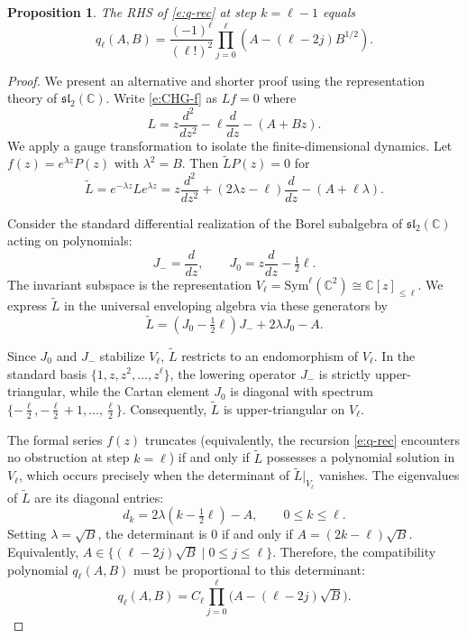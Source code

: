 \documentclass[11pt]{amsart}
\newtheorem{proposition}[theorem]{Proposition}
\theoremstyle{remark}
\numberwithin{equation}{section}
\begin{document}
\begin{proposition} \cite[Lemma 3.3]{Wang_2020} \label{p:topterm}
The RHS of \eqref{e:q-rec} at step $k = \ell - 1$ equals
\begin{equation} \label{e:q-ell}
q_{\ell}(A, B) = \frac{(-1)^\ell}{(\ell !)^2}\prod_{j = 0}^\ell (A - (\ell - 2j)B^{1/2}).
\end{equation}
\end{proposition}

\begin{proof}
We present an alternative and shorter proof using the representation theory of $\mathfrak{sl}_2(\mathbb{C})$. Write \eqref{e:CHG-f} as $Lf = 0$ where 
\[ 
L = z \frac{d^2}{dz^2}  - \ell \frac{d}{dz} - (A + B z). 
\]
We apply a gauge transformation to isolate the finite-dimensional dynamics. Let $f(z) = e^{\lambda z} P(z)$ with $\lambda^2 = B$. Then $\widetilde{L} P(z) = 0$ for
\[ 
\widetilde{L} = e^{-\lambda z} L e^{\lambda z} = z \frac{d^2}{dz^2} + (2\lambda z - \ell) \frac{d}{dz} - (A + \ell \lambda). 
\]

Consider the standard differential realization of the Borel subalgebra of $\mathfrak{sl}_2(\mathbb{C})$ acting on polynomials:
\[
 J_- = \frac{d}{dz}, \qquad J_0 = z \frac{d}{dz} - \tfrac12 \ell. 
 \]
The invariant subspace is the representation $V_\ell = \mathrm{Sym}^\ell(\mathbb{C}^2) \cong \mathbb{C}[z]_{\le \ell}$. We express $\widetilde{L}$ in the universal enveloping algebra via these generators by
\[ 
\widetilde{L} = (J_0 - \tfrac12 \ell )  J_- + 2\lambda J_0 - A. 
\]

Since $J_0$ and $J_-$ stabilize $V_\ell$, $\widetilde{L}$ restricts to an endomorphism of $V_\ell$. In the standard basis $\{1, z, z^2, \dots, z^\ell\}$, the lowering operator $J_-$ is strictly upper-triangular, while the Cartan element $J_0$ is diagonal with spectrum $\{-\frac{\ell}{2}, -\frac{\ell}{2}+1, \dots, \frac{\ell}{2}\}$. Consequently, $\widetilde{L}$ is upper-triangular on $V_\ell$. 

The formal series $f(z)$ truncates (equivalently, the recursion \eqref{e:q-rec} encounters no obstruction at step $k=\ell$) if and only if $\widetilde{L}$ possesses a polynomial solution in $V_\ell$, which occurs precisely when the determinant of $\widetilde{L}|_{V_\ell}$ vanishes. The eigenvalues of $\widetilde{L}$ are its diagonal entries:
\[ 
d_k = 2\lambda (k - \tfrac12 \ell ) - A, \qquad 0 \le k \le \ell. 
\]
Setting $\lambda = \sqrt{B}$, the determinant is $0$ if and only if $A = (2k - \ell)\sqrt{B}$. Equivalently, $A \in \{(\ell - 2j)\sqrt{B} \mid 0 \le j \le \ell\}$. Therefore, the compatibility polynomial $q_\ell(A, B)$ must be proportional to this determinant:
\[ q_\ell(A, B) = C_\ell \prod_{j=0}^\ell \big(A - (\ell - 2j)\sqrt{B}\big). \]


\end{proof}
\end{document}
